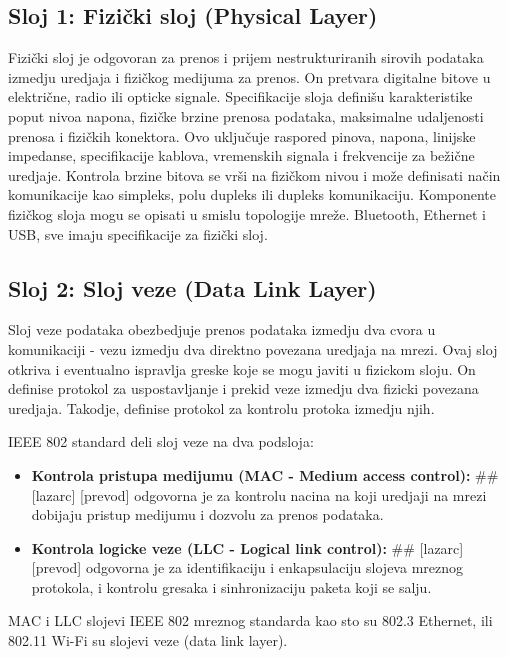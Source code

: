 \documentclass[a4paper,12pt, master]{etf}
\begin{document}
	\subsection{Sloj 1: Fizi\v{c}ki sloj (Physical Layer)}

	Fizi\v{c}ki sloj je odgovoran za prenos i prijem nestrukturiranih sirovih podataka izmedju 
	uredjaja i fizi\v{c}kog medijuma za prenos. On pretvara digitalne bitove u elektri\v{c}ne, radio 
	ili opticke signale. Specifikacije sloja defini\v{s}u karakteristike poput nivoa napona, 
	fizi\v{c}ke brzine prenosa podataka, maksimalne udaljenosti prenosa i fizi\v{c}kih konektora. Ovo 
	uklju\v{c}uje raspored pinova, napona, linijske impedanse, specifikacije kablova, vremenskih 
	signala i frekvencije za be\v{z}i\v{c}ne uredjaje. Kontrola brzine bitova se vr\v{s}i na fizi\v{c}kom 
	nivou i mo\v{z}e definisati na\v{c}in komunikacije kao simpleks, polu dupleks ili dupleks 
	komunikaciju. Komponente fizi\v{c}kog sloja mogu se opisati u smislu topologije mre\v{z}e. 
	Bluetooth, Ethernet i USB, sve imaju specifikacije za fizi\v{c}ki sloj.

	\subsection{Sloj 2: Sloj veze (Data Link Layer)}

	Sloj veze podataka obezbedjuje prenos podataka izmedju dva cvora u komunikaciji - vezu 
	izmedju dva direktno povezana uredjaja na mrezi. Ovaj sloj otkriva i eventualno ispravlja 
	greske koje se mogu javiti u fizickom sloju. On definise protokol za uspostavljanje i 
	prekid veze izmedju dva fizicki povezana uredjaja. Takodje, definise protokol za kontrolu 
	protoka izmedju njih.

	IEEE 802 standard deli sloj veze na dva podsloja:
	\begin{itemize}
		\item \textbf{Kontrola pristupa medijumu (MAC - Medium access control):}
		\#\# [lazarc] [prevod]
		odgovorna je za kontrolu nacina na koji uredjaji na mrezi dobijaju pristup medijumu i
		dozvolu za prenos podataka.
		\item \textbf{Kontrola logicke veze (LLC - Logical link control):}
		\#\# [lazarc] [prevod]
		odgovorna je za identifikaciju i enkapsulaciju slojeva mreznog protokola, i kontrolu
		gresaka i sinhronizaciju paketa koji se salju.
	\end{itemize}

	MAC i LLC slojevi IEEE 802 mreznog standarda kao sto su 802.3 Ethernet, ili 802.11 Wi-Fi su
	slojevi veze (data link layer).
\end{document}
